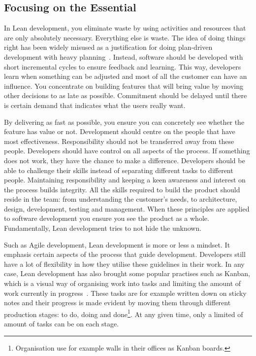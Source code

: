 \documentclass[english]{tktltiki2}
\begin{document}
\subsection{Focusing on the Essential}

In Lean development, you eliminate waste by using activities and resources that are only absolutely necessary. Everything else is waste. The idea of doing things right has been widely misused as a justification for doing plan-driven development with heavy planning~\cite{Pop02}. Instead, software should be developed with short incremental cycles to ensure feedback and learning. This way, developers learn when something can be adjusted and most of all the customer can have an influence. You concentrate on building features that will bring value by moving other decisions to as late as possible. Commitment should be delayed until there is certain demand that indicates what the users really want.

By delivering as fast as possible, you ensure you can concretely see whether the feature has value or not. Development should centre on the people that have most effectiveness. Responsibility should not be transferred away from these people. Developers should have control on all aspects of the process. If something does not work, they have the chance to make a difference. Developers should be able to challenge their skills instead of separating different tasks to different people. Maintaining responsibility and keeping a keen awareness and interest on the process builds integrity. All the skills required to build the product should reside in the team: from understanding the customer’s needs, to architecture, design, development, testing and management. When these principles are applied to software development you ensure you see the product as a whole. Fundamentally, Lean development tries to not hide the unknown.

Such as Agile development, Lean development is more or less a mindset. It emphasis certain aspects of the process that guide development. Developers still have a lot of flexibility in how they utilise these guidelines in their work. In any case, Lean development has also brought some popular practises such as Kanban, which is a visual way of organising work into tasks and limiting the amount of work currently in progress~\cite{Mon12}. These tasks are for example written down on sticky notes and their progress is made evident by moving them through different production stages: to do, doing and done\footnote{Organisation use for example walls in their offices as Kanban boards.}. At any given time, only a limited of amount of tasks can be on each stage.
\end{document}
